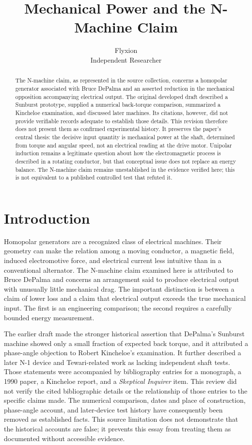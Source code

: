 \documentclass[11pt]{article}
\title{Mechanical Power and the N-Machine Claim}
\author{Flyxion \\ \small Independent Researcher}
\date{}
\begin{document}
\maketitle

\begin{abstract}
The N-machine claim, as represented in the source collection, concerns a homopolar generator associated with Bruce DePalma and an asserted reduction in the mechanical opposition accompanying electrical output. The original developed draft described a Sunburst prototype, supplied a numerical back-torque comparison, summarized a Kincheloe examination, and discussed later machines. Its citations, however, did not provide verifiable records adequate to establish those details. This revision therefore does not present them as confirmed experimental history. It preserves the paper's central thesis: the decisive input quantity is mechanical power at the shaft, determined from torque and angular speed, not an electrical reading at the drive motor. Unipolar induction remains a legitimate question about how the electromagnetic process is described in a rotating conductor, but that conceptual issue does not replace an energy balance. The N-machine claim remains unestablished in the evidence verified here; this is not equivalent to a published controlled test that refuted it.
\end{abstract}

\section{Introduction}

Homopolar generators are a recognized class of electrical machines. Their geometry can make the relation among a moving conductor, a magnetic field, induced electromotive force, and electrical current less intuitive than in a conventional alternator. The N-machine claim examined here is attributed to Bruce DePalma and concerns an arrangement said to produce electrical output with unusually little mechanical drag. The important distinction is between a claim of lower loss and a claim that electrical output exceeds the true mechanical input. The first is an engineering comparison; the second requires a carefully bounded energy measurement.

The earlier draft made the stronger historical assertion that DePalma's Sunburst machine showed only a small fraction of expected back torque, and it attributed a phase-angle objection to Robert Kincheloe's examination. It further described a later N-1 device and Tewari-related work as lacking independent shaft tests. Those statements were accompanied by bibliography entries for a monograph, a 1990 paper, a Kincheloe report, and a \emph{Skeptical Inquirer} item. This review did not verify the cited bibliographic details or the relationship of those entries to the specific claims made. The numerical comparison, dates and place of construction, phase-angle account, and later-device test history have consequently been removed as established facts. This source limitation does not demonstrate that the historical accounts are false; it prevents this essay from treating them as documented without accessible evidence.
\end{document}
